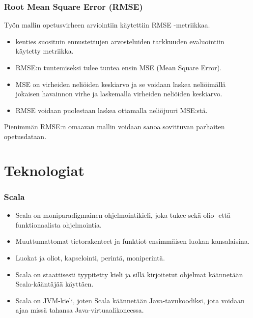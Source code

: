 \documentclass{beamer}
\begin{document}
\begin{frame}
\frametitle{Root Mean Square Error (RMSE)}

Työn mallin opetusvirheen arviointiin käytettiin RMSE -metriikkaa.

\begin{itemize}
	\item kenties suosituin ennustettujen arvosteluiden tarkkuuden evaluointiin käytetty metriikka.
	\item RMSE:n tuntemiseksi tulee tuntea ensin MSE (Mean Square Error).
	\item MSE on virheiden neliöiden keskiarvo ja se voidaan laskea neliöimällä jokaisen havainnon virhe ja laskemalla virheiden neliöiden keskiarvo.
	\item RMSE voidaan puolestaan laskea ottamalla neliöjuuri MSE:stä.
\end{itemize}

Pienimmän RMSE:n omaavan mallin voidaan sanoa sovittuvan parhaiten opetusdataan.

\end{frame}


\section{Teknologiat}

\begin{frame}
\frametitle{Scala}

\begin{itemize}
	\item Scala on moniparadigmainen ohjelmointikieli, joka tukee sekä olio- että funktionaalista ohjelmointia.
	\item Muuttumattomat tietorakenteet ja funktiot ensimmäisen luokan kansalaisina.
	\item Luokat ja oliot, kapselointi, perintä, moniperintä.
	\item Scala on staattisesti tyypitetty kieli ja sillä kirjoitetut ohjelmat käännetään Scala-kääntäjää käyttäen.
	\item Scala on JVM-kieli, joten Scala käännetään Java-tavukoodiksi, jota voidaan ajaa missä tahansa Java-virtuaalikoneessa.
\end{itemize}

\end{frame}
\end{document}
